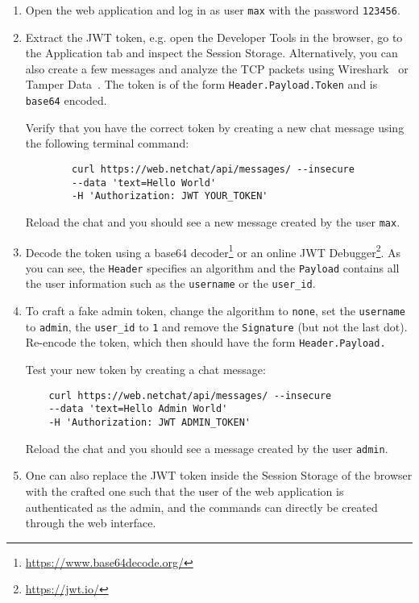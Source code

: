 \documentclass[12pt,a4paper]{article}
\newcommand{\code}[1]{\texttt{#1}}
\begin{document}
\begin{enumerate}
	\item Open the web application and log in as user \code{max} with the password \code{123456}.
	\item Extract the JWT token, e.g. open the Developer Tools in the browser, go to the Application tab and inspect the Session Storage. Alternatively, you can also create a few messages and analyze the TCP packets using Wireshark~\cite{wireshark} or Tamper Data~\cite{tamperdata}. The token is of the form \code{Header.Payload.Token} and is \code{base64} encoded.
	
	Verify that you have the correct token by creating a new chat message using the following terminal command: 
	\begin{verbatim}
		curl https://web.netchat/api/messages/ --insecure
		--data 'text=Hello World'
		-H 'Authorization: JWT YOUR_TOKEN'
	\end{verbatim}
	
	Reload the chat and you should see a new message created by the user \code{max}.
	
	\item Decode the token using a base64 decoder\footnote{\url{https://www.base64decode.org/}} or an online JWT Debugger\footnote{\url{https://jwt.io/}}. As you can see, the \code{Header} specifies an algorithm and the \code{Payload} contains all the user information such as the \code{username} or the \code{user\_id}. 
	\item To craft a fake admin token, change the algorithm to \code{none}, set the \code{username} to \code{admin}, the \code{user\_id} to \code{1} and remove the \code{Signature} (but not the last dot). Re-encode the token, which then should have the form \code{Header.Payload.}
	
	Test your new token by creating a chat message:
	\begin{verbatim}
	curl https://web.netchat/api/messages/ --insecure
	--data 'text=Hello Admin World'
	-H 'Authorization: JWT ADMIN_TOKEN'
	\end{verbatim}
	
	Reload the chat and you should see a message created by the user \code{admin}.
	
	\item One can also replace the JWT token inside the Session Storage of the browser with the crafted one such that the user of the web application is authenticated as the admin, and the commands can directly be created through the web interface.
	 
\end{enumerate}
\end{document}
